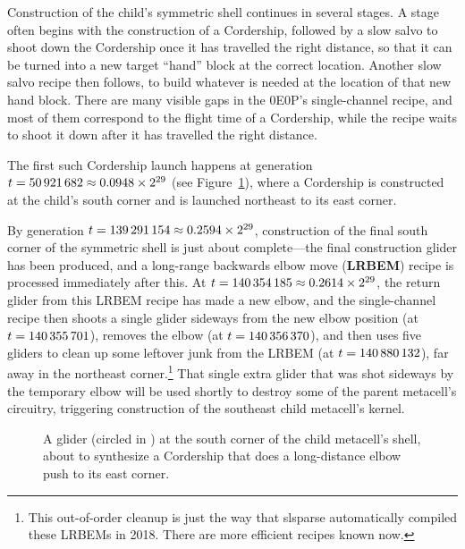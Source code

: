 Construction of the child's symmetric shell continues in several stages. A stage often begins with the construction of a Cordership, followed by a slow salvo to shoot down the Cordership once it has travelled the right distance, so that it can be turned into a new target ``hand'' block at the correct location. Another slow salvo recipe then follows, to build whatever is needed at the location of that new hand block. There are many visible gaps in the 0E0P's single-channel recipe, and most of them correspond to the flight time of a Cordership, while the recipe waits to shoot it down after it has travelled the right distance.

The first such Cordership launch happens at generation $t = 50{\,}921{\,}682 \approx 0.0948 \times 2^{29}$ (see Figure~\ref{fig:0e0p_timeline_50921682}), where a Cordership is constructed at the child's south corner and is launched northeast to its east corner.

By generation $t = 139{\,}291{\,}154 \approx 0.2594 \times 2^{29}$, construction of the final south corner of the symmetric shell is just about complete---the final construction glider has been produced, and a long-range backwards elbow move (\textbf{LRBEM}) recipe is processed immediately after this. At $t = 140{\,}354{\,}185 \approx 0.2614 \times 2^{29}$, the return glider from this LRBEM recipe has made a new elbow, and the single-channel recipe then shoots a single glider sideways from the new elbow position (at $t = 140{\,}355{\,}701$), removes the elbow (at $t = 140{\,}356{\,}370$), and then uses five gliders to clean up some leftover junk from the LRBEM (at $t = 140{\,}880{\,}132$), far away in the northeast corner.\footnote{This out-of-order cleanup is just the way that slsparse automatically compiled these LRBEMs in 2018. There are more efficient recipes known now.} That single extra glider that was shot sideways by the temporary elbow will be used shortly to destroy some of the parent metacell's circuitry, triggering construction of the southeast child metacell's kernel.

\begin{figure}[!htb]
	\centering
	\caption{A glider (circled in ) at the south corner of the child metacell's shell, about to synthesize a Cordership that does a long-distance elbow push to its east corner.}
	\label{fig:0e0p_timeline_50921682}
\end{figure}


